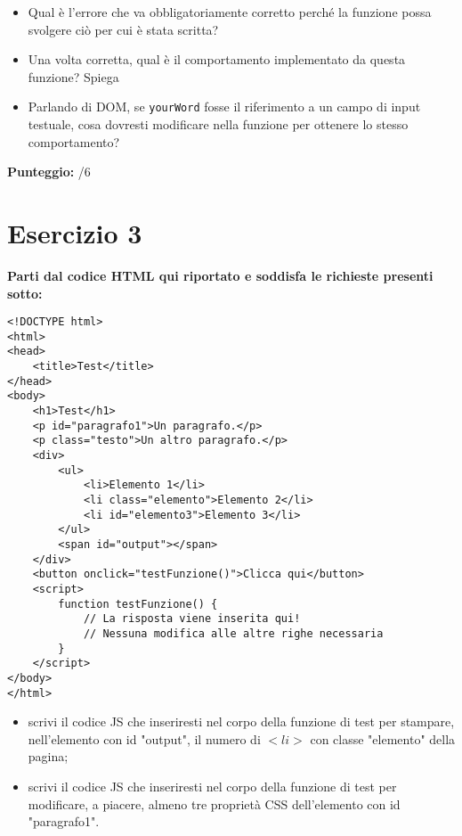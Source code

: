 \documentclass{article}
\begin{document}
\begin{itemize}
    \item Qual è l'errore che va obbligatoriamente corretto perché la funzione possa svolgere ciò per cui è stata scritta?
    \item Una volta corretta, qual è il comportamento implementato da questa funzione? Spiega
    \item Parlando di DOM, se \texttt{yourWord} fosse il riferimento a un campo di input testuale, cosa dovresti modificare nella funzione per ottenere lo stesso comportamento?
\end{itemize}

\begin{flushright}\textbf{Punteggio:} \underline{\hspace{1cm}}/6\end{flushright}

\section*{Esercizio 3}

\textbf{Parti dal codice HTML qui riportato e soddisfa le richieste presenti sotto:}

\begin{lstlisting}
<!DOCTYPE html>
<html>
<head>
    <title>Test</title>
</head>
<body>
    <h1>Test</h1>
    <p id="paragrafo1">Un paragrafo.</p>
    <p class="testo">Un altro paragrafo.</p>
    <div>
        <ul>
            <li>Elemento 1</li>
            <li class="elemento">Elemento 2</li>
            <li id="elemento3">Elemento 3</li>
        </ul>
        <span id="output"></span>
    </div>
    <button onclick="testFunzione()">Clicca qui</button>
    <script>
        function testFunzione() {
            // La risposta viene inserita qui! 
            // Nessuna modifica alle altre righe necessaria
        }
    </script>
</body>
</html>
\end{lstlisting}

\begin{itemize}
    \item scrivi il codice JS che inseriresti nel corpo della funzione di test per stampare, nell'elemento con id "output", il numero di $<li>$ con classe "elemento" della pagina;
    \item scrivi il codice JS che inseriresti nel corpo della funzione di test per modificare, a piacere, almeno tre proprietà CSS dell'elemento con id "paragrafo1".
\end{itemize}
\end{document}
